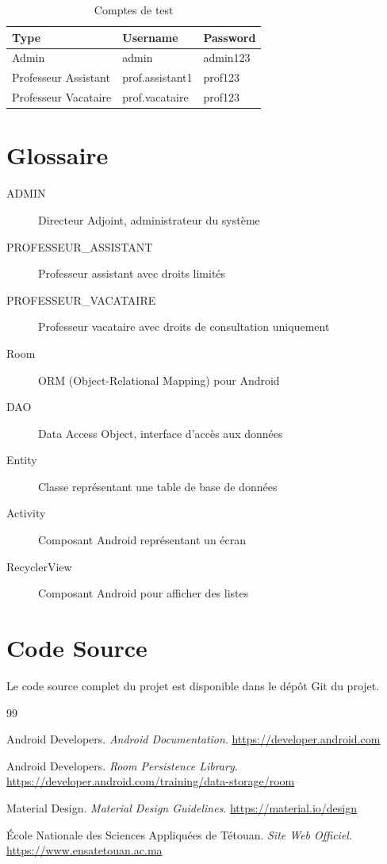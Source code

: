 \documentclass[12pt,a4paper]{report}
\begin{document}
\begin{table}[H]
    \centering
    \begin{tabular}{|l|l|l|}
        \hline
        \textbf{Type} & \textbf{Username} & \textbf{Password} \\
        \hline
        Admin & admin & admin123 \\
        \hline
        Professeur Assistant & prof.assistant1 & prof123 \\
        \hline
        Professeur Vacataire & prof.vacataire & prof123 \\
        \hline
    \end{tabular}
    \caption{Comptes de test}
    \label{tab:test-accounts}
\end{table}

\section{Glossaire}

\begin{description}
    \item[ADMIN] Directeur Adjoint, administrateur du système
    \item[PROFESSEUR\_ASSISTANT] Professeur assistant avec droits limités
    \item[PROFESSEUR\_VACATAIRE] Professeur vacataire avec droits de consultation uniquement
    \item[Room] ORM (Object-Relational Mapping) pour Android
    \item[DAO] Data Access Object, interface d'accès aux données
    \item[Entity] Classe représentant une table de base de données
    \item[Activity] Composant Android représentant un écran
    \item[RecyclerView] Composant Android pour afficher des listes
\end{description}

\section{Code Source}

Le code source complet du projet est disponible dans le dépôt Git du projet.


\begin{thebibliography}{99}

Android Developers. \textit{Android Documentation}. 
\url{https://developer.android.com}

Android Developers. \textit{Room Persistence Library}. 
\url{https://developer.android.com/training/data-storage/room}

Material Design. \textit{Material Design Guidelines}. 
\url{https://material.io/design}

École Nationale des Sciences Appliquées de Tétouan. 
\textit{Site Web Officiel}. \url{https://www.ensatetouan.ac.ma}

\end{thebibliography}
\end{document}
